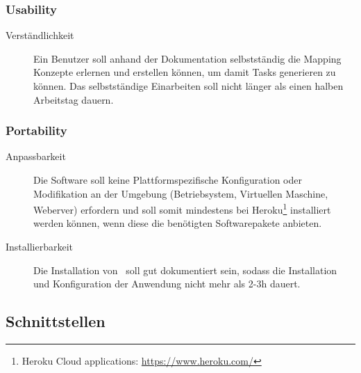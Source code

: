 		\subsubsection{Usability}
		\begin{description}
			\item[Verständlichkeit] Ein Benutzer soll anhand der Dokumentation selbstständig die Mapping Konzepte erlernen und erstellen können, um damit Tasks generieren zu können. Das selbstständige Einarbeiten soll nicht länger als einen halben Arbeitstag dauern.
		\end{description}

		
		\subsubsection{Portability}
		\begin{description}
			\item[Anpassbarkeit] Die Software soll keine Plattformspezifische Konfiguration oder Modifikation an der Umgebung (Betriebsystem, Virtuellen Maschine, Weberver) erfordern und soll somit mindestens bei Heroku\footnote{Heroku Cloud applications: \url{https://www.heroku.com/}} installiert werden können, wenn diese die benötigten Softwarepakete anbieten.
			\item[Installierbarkeit] Die Installation von \eeppi\ soll gut dokumentiert sein, sodass die Installation und Konfiguration der Anwendung nicht mehr als 2-3h dauert.
		\end{description}

	\subsection{Schnittstellen}